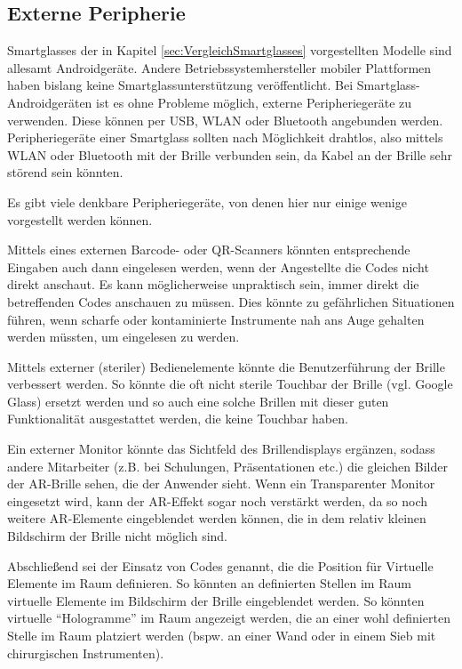 \subsection{Externe Peripherie}
\label{sec:Externe_Peripherie}
Smartglasses der in Kapitel \ref{sec:VergleichSmartglasses} vorgestellten Modelle sind allesamt Androidgeräte. Andere Betriebssystemhersteller mobiler Plattformen haben bislang keine Smartglassunterstützung veröffentlicht. Bei Smartglass-Androidgeräten ist es ohne Probleme möglich, externe Peripheriegeräte zu verwenden. Diese können per USB, WLAN oder Bluetooth angebunden werden.  Peripheriegeräte einer Smartglass sollten nach Möglichkeit drahtlos, also mittels WLAN oder Bluetooth mit der Brille verbunden sein, da Kabel an der Brille sehr störend sein könnten. 

Es gibt viele denkbare Peripheriegeräte, von denen hier nur einige wenige vorgestellt werden können.

Mittels eines externen Barcode- oder QR-Scanners könnten entsprechende Eingaben auch dann eingelesen werden, wenn der Angestellte die Codes nicht direkt anschaut. Es kann möglicherweise unpraktisch sein, immer direkt die betreffenden Codes anschauen zu müssen. Dies könnte zu gefährlichen Situationen führen, wenn scharfe oder kontaminierte Instrumente nah ans Auge gehalten werden müssten, um eingelesen zu werden.

Mittels externer (steriler) Bedienelemente könnte die Benutzerführung der Brille verbessert werden. So könnte die oft nicht sterile Touchbar der Brille (vgl. Google Glass) ersetzt werden und so auch eine solche Brillen mit dieser guten Funktionalität ausgestattet werden, die keine Touchbar haben. 

Ein externer Monitor könnte das Sichtfeld des Brillendisplays ergänzen, sodass andere Mitarbeiter (z.B. bei Schulungen, Präsentationen etc.) die gleichen Bilder der AR-Brille sehen, die der Anwender sieht. Wenn ein Transparenter Monitor eingesetzt wird, kann der AR-Effekt sogar noch verstärkt werden, da so noch weitere AR-Elemente eingeblendet werden können, die in dem relativ kleinen Bildschirm der Brille nicht möglich sind.

Abschließend sei der Einsatz von Codes genannt, die die Position für Virtuelle Elemente im Raum definieren. So könnten an definierten Stellen im Raum virtuelle Elemente im Bildschirm der Brille eingeblendet werden. So könnten virtuelle \enquote{Hologramme} im Raum angezeigt werden, die an einer wohl definierten Stelle im Raum platziert werden (bspw. an einer Wand oder in einem Sieb mit chirurgischen Instrumenten).
%
%
%
%
%
%
